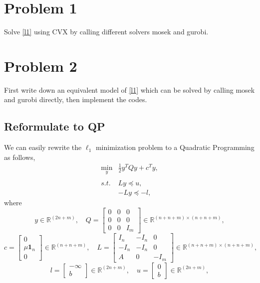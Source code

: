 \documentclass[]{article}
\begin{document}
\newpage

\section{Problem 1}
Solve \ref{l1} using CVX by calling different solvers mosek and gurobi.


\section{Problem 2}
First write down an equivalent model of \ref{l1} which can be solved by calling mosek and gurobi directly, then implement the codes.
\subsection{Reformulate to QP}
We can easily rewrite the $\ell_1$ minimization problem to a Quadratic Programming as follows,
\begin{equation}
\begin{array}{ll}
 \min_y & \frac{1}{2} y^TQy + c^Ty, \\
 &\\
{s.t.} &  L y\preceq u,\\
 &-Ly \preceq -l,
\end{array}
\end{equation}
where
$$y\in \mathbb{R}^{(2n+m)},\quad
Q = \left[ 
\begin{matrix}
0 & 0 & 0 \\
0 & 0 & 0 \\
0 & 0 & I_m
\end{matrix}
\right] \in \mathbb{R}^{(n+n+m)\times(n+n+m)}, $$
$$c = \left[ 
\begin{matrix}
0\\
\mu\mathbf{1}_n  \\
0
\end{matrix}
\right] \in \mathbb{R}^{(n+n+m)}, \quad
L = \left[ 
\begin{matrix}
I_n & -I_n & 0 \\
-I_n & -I_n & 0 \\
A & 0 & -I_m
\end{matrix}
\right] \in \mathbb{R}^{(n+n+m)\times(n+n+m)}, $$
$$l = \left[ 
\begin{matrix}
-\infty\\
b
\end{matrix}
\right] \in \mathbb{R}^{(2n+m)}, \quad
u = \left[ 
\begin{matrix}
0\\
b
\end{matrix}
\right] \in \mathbb{R}^{(2n+m)}, $$
\end{document}
